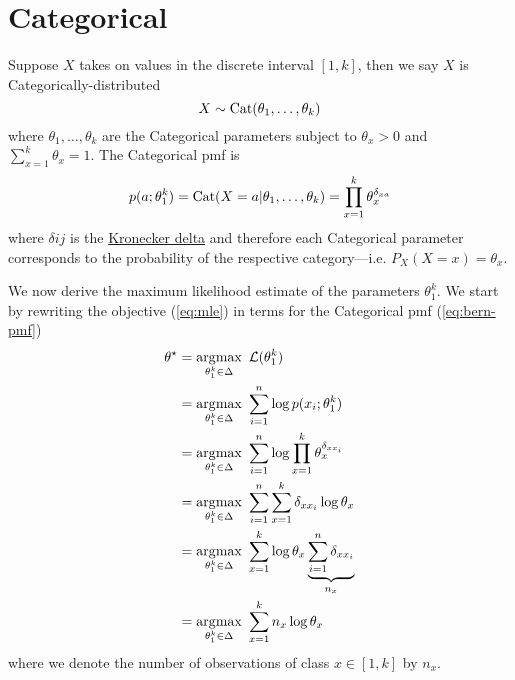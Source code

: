 \section{Categorical}

Suppose $X$ takes on values in the discrete interval $[1, k]$, then we say $X$ is Categorically-distributed 
\begin{equation}\label{eq:cat-pmf}
X \sim \operatorname{Cat}(\theta_1, \ldots, \theta_k)
\end{equation}
where $\theta_1, \ldots, \theta_k$ are the Categorical parameters subject to $\theta_x > 0$ and $\sum_{x=1}^k \theta_x = 1$. 
The Categorical pmf is
\begin{equation}
p(a; \theta_1^k) = \operatorname{Cat}(X=a|\theta_1, \ldots, \theta_k) = \prod_{x=1}^k \theta_x^{\delta_{xa}}
\end{equation}
where $\delta{ij}$ is the \href{https://en.wikipedia.org/wiki/Kronecker_delta}{Kronecker delta} and therefore each Categorical parameter corresponds to the probability of the respective category---i.e. $P_X(X=x) = \theta_x$.

We now derive the maximum likelihood estimate of the parameters $\theta_1^k$.
We start by rewriting the objective (\ref{eq:mle}) in terms for the Categorical  pmf (\ref{eq:bern-pmf})
\begin{subequations}
\begin{align}
\theta^\star &= \operatorname*{\arg\!\max}_{\theta_1^k \in \Delta} ~ \mathcal L(\theta_1^k)  \\
 &= \operatorname*{\arg\!\max}_{\theta_1^k\in \Delta} ~ \sum_{i=1}^n \log p(x_i; \theta_1^k) \label{bern:pmf-in}\\
 &= \operatorname*{\arg\!\max}_{\theta_1^k\in \Delta} ~ \sum_{i=1}^n  \log \prod_{x=1}^k \theta_x^{\delta_{x x_i}} \\
 &= \operatorname*{\arg\!\max}_{\theta_1^k\in \Delta} ~ \sum_{i=1}^n \sum_{x=1}^k \delta_{x x_i} \log \theta_x\\
 &= \operatorname*{\arg\!\max}_{\theta_1^k\in \Delta} ~ \sum_{x=1}^k \log \theta_x \underbrace{\sum_{i=1}^n \delta_{x x_i}}_{n_x} \\
 &= \operatorname*{\arg\!\max}_{\theta_1^k\in \Delta} ~ \sum_{x=1}^k n_x \log \theta_x 
\end{align}
\end{subequations}
where we denote the number of observations of class $x \in [1, k]$ by $n_x$.

